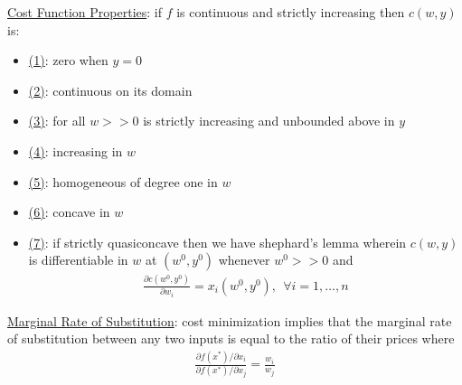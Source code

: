 \documentclass{article}
\begin{document}
  \par
  \underline{Cost Function Properties}: if $f$ is continuous and strictly increasing then $c(w,y)$ is:
  \begin{itemize}
    \item  \underline{(1)}: zero when $y = 0$
    \item  \underline{(2)}: continuous on its domain
    \item  \underline{(3)}: for all $w >> 0$ is strictly increasing and unbounded above in $y$
    \item  \underline{(4)}: increasing in $w$
    \item  \underline{(5)}: homogeneous of degree one in $w$
    \item  \underline{(6)}: concave in $w$
    \item  \underline{(7)}: if strictly quasiconcave then we have shephard's lemma wherein $c(w,y)$ is differentiable in $w$ at $(w^{0}, y^{0})$ whenever $w^{0} >> 0$ and
    \begin{gather*}
      \frac{\partial c (w^{0}, y^{0})}{\partial w_{i}} = x_{i}(w^{0}, y^{0}), \ \ \forall i = 1, \dots, n
    \end{gather*}
  \end{itemize}
  \par
  \underline{Marginal Rate of Substitution}: cost minimization implies that the marginal rate of substitution between any two inputs is equal to the ratio of their prices where
  \begin{gather*}
    \frac{\partial f(x^{*})/ \partial x_{i}}{\partial f(x^{*}) / \partial x_{j}} = \frac{w_{i}}{w_{j}}
  \end{gather*}
\end{document}
